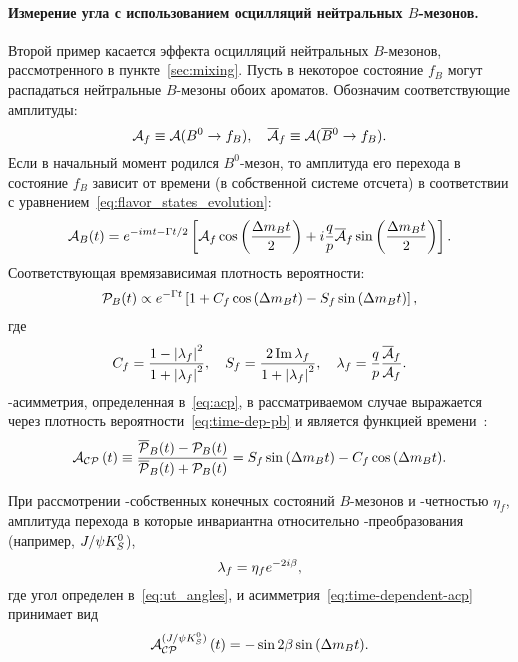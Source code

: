 \paragraph{\boldmath Измерение угла \pphi с использованием осцилляций нейтральных $B$-мезонов.} Второй пример касается эффекта осцилляций нейтральных $B$-мезонов, рассмотренного в пункте~\ref{sec:mixing}.  Пусть в некоторое состояние $f_B$ могут распадаться нейтральные $B$-мезоны обоих ароматов.  Обозначим соответствующие амплитуды:
\begin{equation}
 \mathcal{A}_f \equiv \mathcal{A}(B^0\to f_B),\quad \overline{\mathcal{A}}{}_f \equiv \mathcal{A}(\overline{B}{}^0\to f_B).
\end{equation}
Если в начальный момент родился $B^0$-мезон, то амплитуда его перехода в состояние $f_B$ зависит от времени (в собственной системе отсчета) в соответствии с уравнением~\eqref{eq:flavor_states_evolution}:
\begin{equation}
 \mathcal{A}_B(t) = e^{-imt-\Gamma t/2}\left[\mathcal{A}_f\cos\left(\frac{\Delta m_B t}{2}\right) + i\frac{q}{p}\overline{\mathcal{A}}{}_f\sin\left(\frac{\Delta m_B t}{2}\right)\right].
\end{equation}
Соответствующая времязависимая плотность вероятности:
\begin{equation}\label{eq:time-dep-pb}
 \mathcal{P}_B(t) \propto e^{-\Gamma t}\left[1 + C_f\cos{\ensuremath{\left(\Delta m_B t\right)}} - S_f\sin{\ensuremath{\left(\Delta m_B t\right)}}\right],
\end{equation}
где 
\begin{equation}\label{eq:lamf}
 C_f = \frac{1-\left|\lambda_f\right|^2}{1+\left|\lambda_f\right|^2},\quad
 S_f = \frac{2\,\mathrm{Im}\,\lambda_f}{1+\left|\lambda_f\right|^2},\quad
 \lambda_f=\frac{q}{p}\frac{\overline{\mathcal{A}}{}_f}{\mathcal{A}_f}.
\end{equation}
\cpconj-асимметрия, определенная в~\eqref{eq:acp}, в рассматриваемом случае выражается через плотность вероятности~\eqref{eq:time-dep-pb} и является функцией времени~\cite{CarterSanda,BigiSanda}:
\begin{equation}\label{eq:time-dependent-acp}
 \mathcal{A}_\mathcal{CP}\left(t\right) \equiv \frac{\overline{\mathcal{P}}_B(t) - \mathcal{P}_B(t)}{\overline{\mathcal{P}}_B(t) + \mathcal{P}_B(t)} = 
 S_f\sin{\ensuremath{\left(\Delta m_B t\right)}} - C_f\cos{\ensuremath{\left(\Delta m_B t\right)}}.
\end{equation}

При рассмотрении \cpconj-собственных конечных состояний $B$-мезонов и \cpconj-четностью $\eta_f$, амплитуда перехода в которые инвариантна относительно \cpconj-преобразования (например, $J/\psi K_S^0$), 
\begin{equation}\label{eq:qpbeta}
 \lambda_f = \eta_f e^{-2i\beta},
\end{equation}
где угол \pphi определен в~\eqref{eq:ut_angles}, и асимметрия~\eqref{eq:time-dependent-acp} принимает вид
\begin{equation}\label{eq:time-dependent-acp-jpsi}
 \mathcal{A}^{(J/\psi K_S^0)}_\mathcal{CP}\left(t\right) = -\sin{2\ensuremath{\beta}}\sin{\ensuremath{\left(\Delta m_B t\right)}}.
\end{equation}

